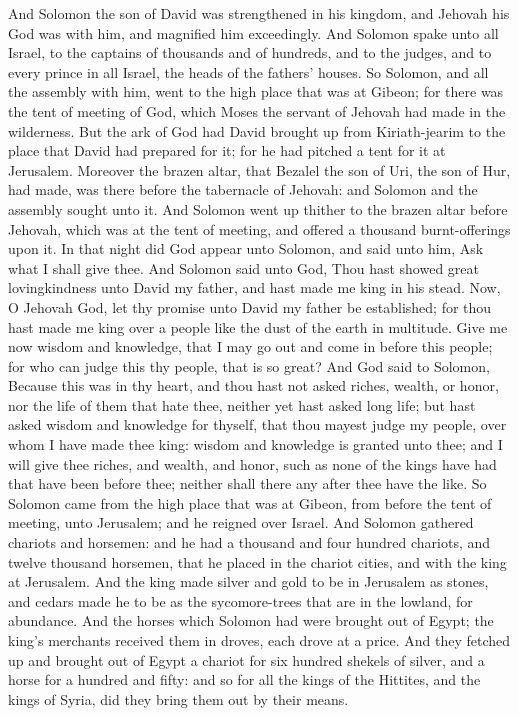 


And Solomon the son of David was strengthened in his kingdom, and Jehovah his God was with him, and magnified him exceedingly. And Solomon spake unto all Israel, to the captains of thousands and of hundreds, and to the judges, and to every prince in all Israel, the heads of the fathers’ houses. So Solomon, and all the assembly with him, went to the high place that was at Gibeon; for there was the tent of meeting of God, which Moses the servant of Jehovah had made in the wilderness. But the ark of God had David brought up from Kiriath-jearim to the place that David had prepared for it; for he had pitched a tent for it at Jerusalem. Moreover the brazen altar, that Bezalel the son of Uri, the son of Hur, had made, was there before the tabernacle of Jehovah: and Solomon and the assembly sought unto it. And Solomon went up thither to the brazen altar before Jehovah, which was at the tent of meeting, and offered a thousand burnt-offerings upon it.  In that night did God appear unto Solomon, and said unto him, Ask what I shall give thee. And Solomon said unto God, Thou hast showed great lovingkindness unto David my father, and hast made me king in his stead. Now, O Jehovah God, let thy promise unto David my father be established; for thou hast made me king over a people like the dust of the earth in multitude. Give me now wisdom and knowledge, that I may go out and come in before this people; for who can judge this thy people, that is so great? And God said to Solomon, Because this was in thy heart, and thou hast not asked riches, wealth, or honor, nor the life of them that hate thee, neither yet hast asked long life; but hast asked wisdom and knowledge for thyself, that thou mayest judge my people, over whom I have made thee king: wisdom and knowledge is granted unto thee; and I will give thee riches, and wealth, and honor, such as none of the kings have had that have been before thee; neither shall there any after thee have the like. So Solomon came from the high place that was at Gibeon, from before the tent of meeting, unto Jerusalem; and he reigned over Israel.  And Solomon gathered chariots and horsemen: and he had a thousand and four hundred chariots, and twelve thousand horsemen, that he placed in the chariot cities, and with the king at Jerusalem. And the king made silver and gold to be in Jerusalem as stones, and cedars made he to be as the sycomore-trees that are in the lowland, for abundance. And the horses which Solomon had were brought out of Egypt; the king’s merchants received them in droves, each drove at a price. And they fetched up and brought out of Egypt a chariot for six hundred shekels of silver, and a horse for a hundred and fifty: and so for all the kings of the Hittites, and the kings of Syria, did they bring them out by their means. 

